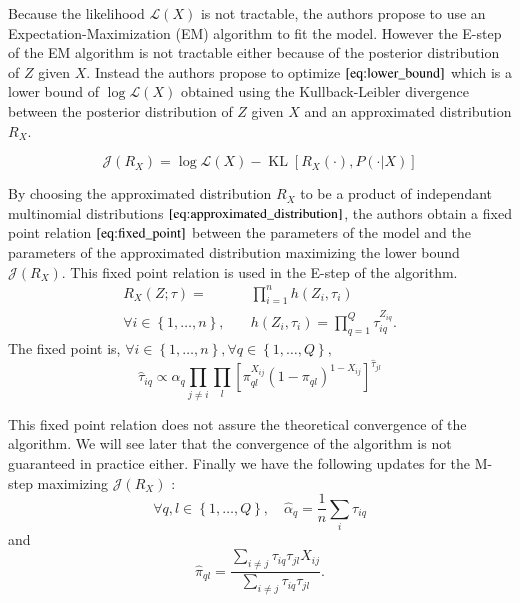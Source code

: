 \documentclass[switch, 12pt]{article}
\DeclareMathOperator*{\KL}{KL}
\begin{document}
\begin{multicols}{2}
    Because the likelihood $\mathcal{L}(X)$ is not tractable, the authors propose to use an Expectation-Maximization (EM) algorithm to fit the model. However the E-step of the EM algorithm is not tractable either because of the posterior distribution of $Z$ given $X$. Instead the authors propose to optimize $\eqref{eq:lower_bound}$ which is a lower bound of $\log\mathcal{L}(X)$ obtained using the Kullback-Leibler divergence between the posterior distribution of $Z$ given $X$ and an approximated distribution $R_X$.

    \begin{equation}
        \label{eq:lower_bound}
        \mathcal{J}(R_X)=\log \mathcal{L}(X)-\KL[R_X(\cdot), P(\cdot|X)]
    \end{equation}

    By choosing the approximated distribution $R_X$ to be a product of independant multinomial distributions $\eqref{eq:approximated_distribution}$, the authors obtain a fixed point relation $\eqref{eq:fixed_point}$ between the parameters of the model and the parameters of the approximated distribution maximizing the lower bound $\mathcal{J}(R_X)$. This fixed point relation is used in the E-step of the algorithm.
    \begin{equation}
        \label{eq:approximated_distribution}
        \begin{aligned}
            R_X(Z; \tau)=                                 & \prod_{i=1}^n h(Z_i, \tau_i)                     \\
            \forall i \in \left\{1,\dots,n\right\}, \quad & h(Z_i, \tau_i)=\prod_{q=1}^Q \tau_{iq}^{Z_{iq}}.
        \end{aligned}
    \end{equation}
    The fixed point is, $\forall i \in \left\{1,\dots,n\right\}, \forall q \in \left\{1,\dots,Q\right\},$
    \begin{equation}
        \label{eq:fixed_point}
        \hat{\tau}_{iq}\propto \alpha_q \prod_{j\neq i}\prod_l \left[\pi_{ql}^{X_{ij}}(1-\pi_{ql})^{1-X_{ij}}\right]^{\hat{\tau}_{jl}}
    \end{equation}

    This fixed point relation does not assure the theoretical convergence of the algorithm. We will see later that the convergence of the algorithm is not guaranteed in practice either. Finally we have the following updates for the M-step maximizing $\mathcal{J}(R_X)$ :
    \begin{equation}
        \label{eq:m_step}
        \forall q, l \in \left\{1,\dots,Q\right\}, \quad
        \hat{\alpha}_q=\frac{1}{n}\sum_{i} \tau_{iq}
    \end{equation}
    and
    \begin{equation}
        \hat{\pi}_{ql}=\frac{\sum_{i\neq j} \tau_{iq}\tau_{jl}X_{ij}}{\sum_{i\neq j} \tau_{iq}\tau_{jl}}.
    \end{equation}


\end{multicols}
\end{document}

